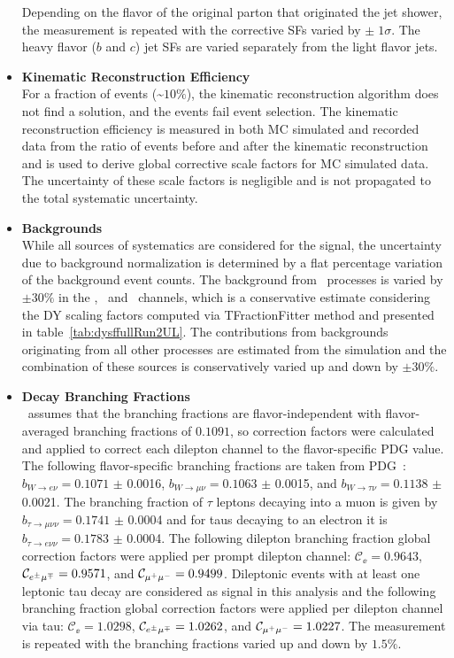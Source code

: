 \begin{refsection}
\begin{itemize}
    Depending on the flavor of the original parton that originated the jet shower, the measurement is repeated with the corrective SFs varied by $\pm \; 1 \sigma$.
    The heavy flavor ($b$ and $c$) jet SFs are varied separately from the light flavor jets.
    \item {\bf Kinematic Reconstruction Efficiency} \\
    For a fraction of events (\sim$10 \%$), the kinematic reconstruction algorithm does not find a solution, and the events fail event selection.
    The kinematic reconstruction efficiency is measured in both MC simulated and recorded data from the ratio of events before and after the kinematic reconstruction and is used to derive global corrective scale factors for MC simulated data.
    The uncertainty of these scale factors is negligible and is not propagated to the total systematic uncertainty.
    \item {\bf Backgrounds} \\
    While all sources of systematics are considered for the signal, the uncertainty due to background normalization is determined by a flat percentage variation of the background event counts.
    The background from \zjets\ processes is varied by $\pm 30\%$ in the \ee, \emu\ and \mumu\ channels, which is a conservative estimate considering the DY scaling factors computed via TFractionFitter method and presented in table~\ref{tab:dysffullRun2UL}. 
    The contributions from backgrounds originating from all other processes are estimated from the simulation and the combination of these sources is conservatively varied up and down by $\pm 30\%$.
    \item {\bf Decay Branching Fractions} \\
    \Powheg\ assumes that the \ttbar branching fractions are flavor-independent with flavor-averaged branching fractions of $0.1091$, so correction factors were calculated and applied to correct each dilepton channel to the flavor-specific PDG value.
    The following flavor-specific branching fractions are taken from PDG~\cite{bib:PDG}: $b_{{\ensuremath{W\to e\nu}}} = 0.1071$ $\pm$ 0.0016, $b_{{\ensuremath{W\to \mu\nu}}} = 0.1063$ $\pm$ 0.0015, and $b_{{\ensuremath{W\to \tau\nu}}} = 0.1138$ $\pm$ 0.0021.
    The branching fraction of $\tau$ leptons decaying into a muon is given by $b_{{\ensuremath{\tau\to \mu\nu\nu}}} = 0.1741$ $\pm$ 0.0004 and for taus decaying to an electron it is $b_{{\ensuremath{\tau\to e\nu\nu}}} = 0.1783$ $\pm$ 0.0004.
    The following \ttbar dilepton branching fraction global correction factors were applied per prompt dilepton channel: $\mathcal{C}_{\ee} = 0.9643$, $\mathcal{C}_{e^{\pm}\mu^{\mp}} = 0.9571$, and $\mathcal{C}_{\mu^{+}\mu^{-}} = 0.9499$.  
    Dileptonic \ttbar events with at least one leptonic tau decay are considered as signal in this analysis and the following branching fraction global correction factors were applied per dilepton channel via tau: $\mathcal{C}_{\ee} = 1.0298$, $\mathcal{C}_{e^{\pm}\mu^{\mp}} = 1.0262$, and $\mathcal{C}_{\mu^{+}\mu^{-}} = 1.0227$.
    The measurement is repeated with the branching fractions varied up and down by $1.5 \%$.
\end{itemize}


\end{refsection}
